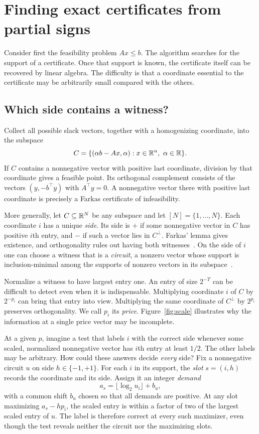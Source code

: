 \section{Finding exact certificates from partial signs}\label{sec:overview}

Consider first the feasibility problem \(Ax\le b\). The algorithm searches
for the support of a certificate. Once that support is known, the
certificate itself can be recovered by linear algebra. The difficulty is
that a coordinate essential to the certificate may be arbitrarily small
compared with the others.

\subsection{Which side contains a witness?}

Collect all possible slack vectors, together with a homogenizing
coordinate, into the subspace
\[
 C=\{(\alpha b-Ax,\alpha):x\in\mathbb R^n,\ \alpha\in\mathbb R\}.
\]
If \(C\) contains a nonnegative vector with positive last coordinate,
division by that coordinate gives a feasible point. Its orthogonal
complement consists of the vectors \((y,-b^\top y)\) with \(A^\top y=0\).
A nonnegative vector there with positive last coordinate is precisely a
Farkas certificate of infeasibility.

More generally, let \(C\subseteq\mathbb R^N\) be any subspace and let
\([N]=\{1,\ldots,N\}\). Each coordinate \(i\) has a unique \emph{side}.
Its side is \(+\) if some nonnegative vector in \(C\) has positive
\(i\)th entry, and \(-\) if such a vector lies in \(C^\perp\). Farkas'
lemma gives existence, and orthogonality rules out having both
witnesses~\cite{Fark}. On the side of \(i\) one can choose a witness
that is a \emph{circuit}, a nonzero vector whose support is
inclusion-minimal among the supports of nonzero vectors in its
subspace~\cite{Rock}.

Normalize a witness to have largest entry one. An entry of size
\(2^{-T}\) can be difficult to detect even when it is indispensable.
Multiplying coordinate \(i\) of \(C\) by \(2^{-p_i}\) can bring that
entry into view. Multiplying the same coordinate of \(C^\perp\) by
\(2^{p_i}\) preserves orthogonality. We call \(p_i\) its \emph{price}.
Figure~\ref{fig:scale} illustrates why the information at a single
price vector may be incomplete.



At a given \(p\), imagine a test that labels \(i\) with the correct
side whenever some scaled, normalized nonnegative vector has \(i\)th
entry at least \(1/2\). The other labels may be arbitrary. How could
these answers decide \emph{every} side? Fix a nonnegative circuit \(u\)
on side \(h\in\{-1,+1\}\). For each \(i\) in its support, the
\emph{slot} \(s=(i,h)\) records the coordinate and its side. Assign it
an integer \emph{demand}
\[
 a_s=\lfloor\log_2 u_i\rfloor+b_u,
\]
with a common shift \(b_u\) chosen so that all demands are positive.
At any slot maximizing \(a_s-hp_i\), the scaled entry is within a
factor of two of the largest scaled entry of \(u\). The label is
therefore correct at every such maximizer, even though the test
reveals neither the circuit nor the maximizing slots.

